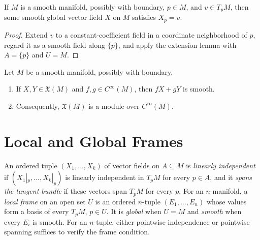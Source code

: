 \begin{proposition}
\label{prop:8-7}
\leanok
{}
If $M$ is a smooth manifold, possibly with boundary, $p\in M$, and
$v\in T_pM$, then some smooth global vector field $X$ on $M$ satisfies
$X_p=v$.
\end{proposition}

\begin{proof}
\leanok
\sketch Extend $v$ to a constant-coefficient field in a coordinate
neighborhood of $p$, regard it as a smooth field along $\{p\}$, and apply the
extension lemma with $A=\{p\}$ and $U=M$.
\end{proof}

\begin{proposition}
\label{prop:8-8}
\leanok
{}
Let $M$ be a smooth manifold, possibly with boundary.
\begin{enumerate}
\item If $X,Y\in\mathfrak{X}(M)$ and $f,g\in C^\infty(M)$, then
$fX+gY$ is smooth.
\item Consequently, $\mathfrak{X}(M)$ is a module over $C^\infty(M)$.
\end{enumerate}
\end{proposition}


\section{Local and Global Frames}

\begin{definition}
\label{def:8-55-extra-1}
\leanok
An ordered tuple $(X_1,\ldots,X_k)$ of vector fields on $A\subseteq M$ is
\emph{linearly independent} if $(X_1|_p,\ldots,X_k|_p)$ is linearly
independent in $T_pM$ for every $p\in A$, and it
\emph{spans the tangent bundle} if these vectors span $T_pM$ for every $p$.
For an $n$-manifold, a \emph{local frame} on an open set $U$ is an ordered
$n$-tuple $(E_1,\ldots,E_n)$ whose values form a basis of every $T_pM$,
$p\in U$. It is \emph{global} when $U=M$ and \emph{smooth} when every $E_i$
is smooth. For an $n$-tuple, either pointwise independence or pointwise
spanning suffices to verify the frame condition.
\end{definition}

